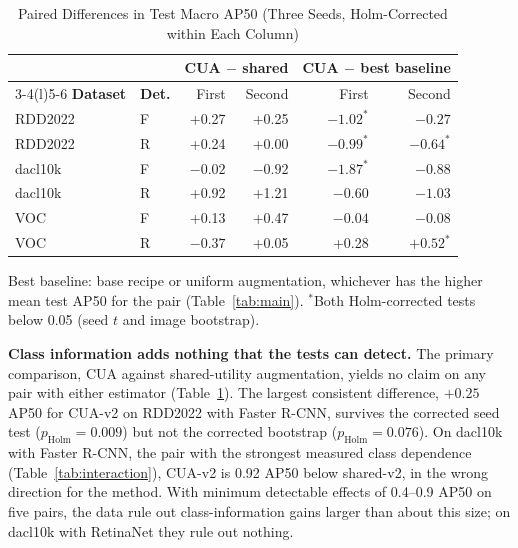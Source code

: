 \documentclass[conference]{IEEEtran}
\begin{document}
\begin{table}[t]
\caption{Paired Differences in Test Macro AP50 (Three Seeds, Holm-Corrected within Each Column)}
\label{tab:comparisons}
\centering
\footnotesize
\setlength{\tabcolsep}{2.4pt}
\begin{tabular}{@{}llrrrr@{}}
\toprule
 & & \multicolumn{2}{c}{\textbf{CUA $-$ shared}} & \multicolumn{2}{c}{\textbf{CUA $-$ best baseline}} \\
\cmidrule(lr){3-4}\cmidrule(l){5-6}
\textbf{Dataset} & \textbf{Det.} & First & Second & First & Second \\
\midrule
RDD2022 & F & +0.27 & +0.25 & $\mathbf{-1.02}^{\ast}$ & $-0.27$ \\
RDD2022 & R & +0.24 & +0.00 & $\mathbf{-0.99}^{\ast}$ & $\mathbf{-0.64}^{\ast}$ \\
dacl10k & F & $-0.02$ & $-0.92$ & $\mathbf{-1.87}^{\ast}$ & $-0.88$ \\
dacl10k & R & +0.92 & +1.21 & $-0.60$ & $-1.03$ \\
VOC & F & +0.13 & +0.47 & $-0.04$ & $-0.08$ \\
VOC & R & $-0.37$ & +0.05 & +0.28 & $\mathbf{+0.52}^{\ast}$ \\
\bottomrule
\end{tabular}
\vspace{2pt}

\parbox{\columnwidth}{\footnotesize Best baseline: base recipe or uniform augmentation, whichever has the higher mean test AP50 for the pair (Table~\ref{tab:main}). $^{\ast}$Both Holm-corrected tests below 0.05 (seed $t$ and image bootstrap).}
\end{table}

\noindent\textbf{Class information adds nothing that the tests can detect.} The primary comparison, CUA against shared-utility augmentation, yields no claim on any pair with either estimator (Table~\ref{tab:comparisons}). The largest consistent difference, $+0.25$ AP50 for CUA-v2 on RDD2022 with Faster R-CNN, survives the corrected seed test ($p_{\mathrm{Holm}}=0.009$) but not the corrected bootstrap ($p_{\mathrm{Holm}}=0.076$). On dacl10k with Faster R-CNN, the pair with the strongest measured class dependence (Table~\ref{tab:interaction}), CUA-v2 is 0.92 AP50 below shared-v2, in the wrong direction for the method. With minimum detectable effects of 0.4--0.9 AP50 on five pairs, the data rule out class-information gains larger than about this size; on dacl10k with RetinaNet they rule out nothing.
\end{document}
